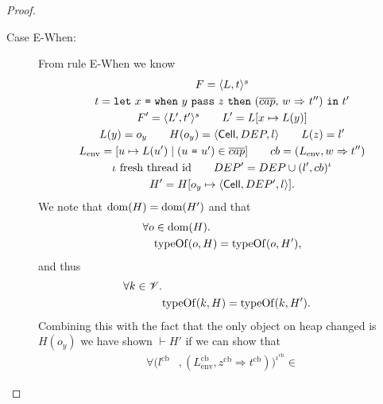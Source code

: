 \begin{proof}
\begin{description}
\begin{description}
\begin{description}
            \item[Case {\sc E-When}:] From rule {\sc E-When} we know
              \begin{equation}
                \begin{gathered}
                  F = \mbox{$\langle L, t \rangle^s$} \\ 
                  t = \mbox{\mdseries\texttt{let}~$x$~\texttt{=}~$\mbox{\mdseries\texttt{when}~$y$~\texttt{pass}~$z$~\texttt{then}~$\mbox{\mdseries($\overline{cap}$, $w$~$\Rightarrow$~$t''$)}$}$~\texttt{in}~$t'$} \\
                  F' = \mbox{$\langle L', t' \rangle^s$} \quad\quad L' = L[x \mapsto L(y)] \\
                  L(y) = o_y \quad\quad H(o_y) = \mbox{$\langle \mbox{$\mathsf{Cell}$}{}, DEP, l \rangle$} \quad\quad L(z) = l' \\
                  L_{\text{env}} = [u \mapsto L(u') \mid (\mbox{\mdseries$u$~\texttt{=}~$u'$}) \in
                  \overline{cap}] \quad\quad cb = (L_{\text{env}}, w \Rightarrow
                  t'') \\
                  \iota \text{ fresh thread id} \quad\quad DEP' = DEP \cup (l',
                  cb)^\iota
                  \\
                  H' = H[o_y \mapsto \mbox{$\langle \mbox{$\mathsf{Cell}$}{}, DEP', l \rangle$}].
                \end{gathered}
              \end{equation}
              We note that $\mbox{$\mathrm{dom}$}(H) = \mbox{$\mathrm{dom}$}(H')$ and that
              \begin{equation} \label{eq:ewhen-h5}
                \begin{aligned}
                  \forall o &\in \mbox{$\mathrm{dom}$}(H).  \\
                    &\mbox{$\mathrm{typeOf}$}(o, H) = \mbox{$\mathrm{typeOf}$}(o, H'),
                \end{aligned}
              \end{equation}
              and thus
              \begin{equation}
                \begin{aligned}
                  \forall k \in \mathscr{V} . \\
                    &\mbox{$\mathrm{typeOf}$}(k, H) = \mbox{$\mathrm{typeOf}$}(k, H').
                \end{aligned}
              \end{equation}
              Combining this with the fact that the only object on heap changed
              is $H(o_y)$ we have shown $\vdash H'$ if we can show that
              \begin{equation}
                \begin{aligned}
                  \forall (l^{\text{cb}}&, (L^{\text{cb}}_{\text{env}},
                  z^{\text{cb}} \Rightarrow t^{\text{cb}}))^{\iota^{\text{cb}}} \in

\end{aligned}
\end{equation}
\end{description}
\end{description}
\end{description}
\end{proof}
